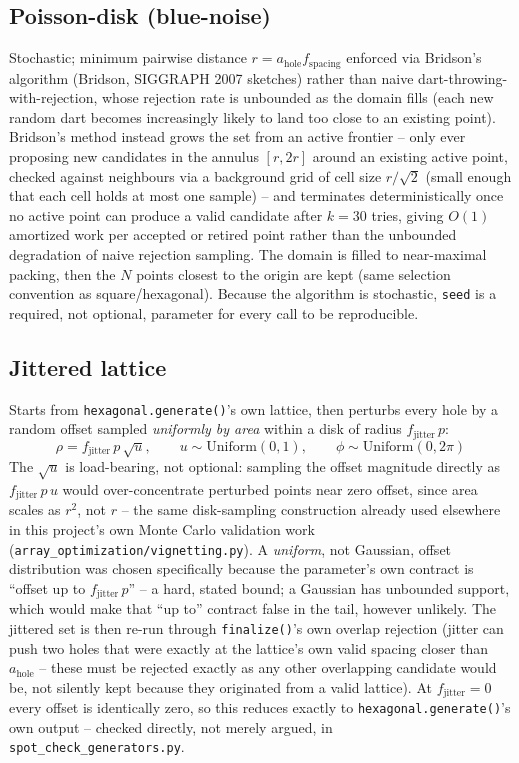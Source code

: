 \subsection{Poisson-disk (blue-noise)}
Stochastic; minimum pairwise distance $r=a_{\mathrm{hole}}f_{\mathrm{spacing}}$
enforced via Bridson's algorithm (Bridson, SIGGRAPH 2007 sketches) rather than naive
dart-throwing-with-rejection, whose rejection rate is unbounded as the domain fills
(each new random dart becomes increasingly likely to land too close to an existing
point). Bridson's method instead grows the set from an active frontier -- only ever
proposing new candidates in the annulus $[r,2r]$ around an existing active point,
checked against neighbours via a background grid of cell size $r/\sqrt2$ (small enough
that each cell holds at most one sample) -- and terminates deterministically once no
active point can produce a valid candidate after $k=30$ tries, giving $O(1)$ amortized
work per accepted or retired point rather than the unbounded degradation of naive
rejection sampling. The domain is filled to near-maximal packing, then the $N$ points
closest to the origin are kept (same selection convention as square/hexagonal). Because
the algorithm is stochastic, \texttt{seed} is a required, not optional, parameter for
every call to be reproducible.

\subsection{Jittered lattice}
Starts from \texttt{hexagonal.generate()}'s own lattice, then perturbs every hole by a
random offset sampled \emph{uniformly by area} within a disk of radius
$f_{\mathrm{jitter}}\,p$:
\begin{equation}
\rho = f_{\mathrm{jitter}}\,p\,\sqrt{u}, \qquad u\sim\mathrm{Uniform}(0,1), \qquad
\phi\sim\mathrm{Uniform}(0,2\pi)
\end{equation}
The $\sqrt{u}$ is load-bearing, not optional: sampling the offset magnitude directly as
$f_{\mathrm{jitter}}\,p\,u$ would over-concentrate perturbed points near zero offset,
since area scales as $r^2$, not $r$ -- the same disk-sampling construction already used
elsewhere in this project's own Monte Carlo validation work
(\texttt{array\_optimization/vignetting.py}). A \emph{uniform}, not Gaussian, offset
distribution was chosen specifically because the parameter's own contract is ``offset
up to $f_{\mathrm{jitter}}\,p$'' -- a hard, stated bound; a Gaussian has unbounded
support, which would make that ``up to'' contract false in the tail, however unlikely.
The jittered set is then re-run through \texttt{finalize()}'s own overlap rejection
(jitter can push two holes that were exactly at the lattice's own valid spacing closer
than $a_{\mathrm{hole}}$ -- these must be rejected exactly as any other overlapping
candidate would be, not silently kept because they originated from a valid lattice).
At $f_{\mathrm{jitter}}=0$ every offset is identically zero, so this reduces exactly to
\texttt{hexagonal.generate()}'s own output -- checked directly, not merely argued, in
\texttt{spot\_check\_generators.py}.
